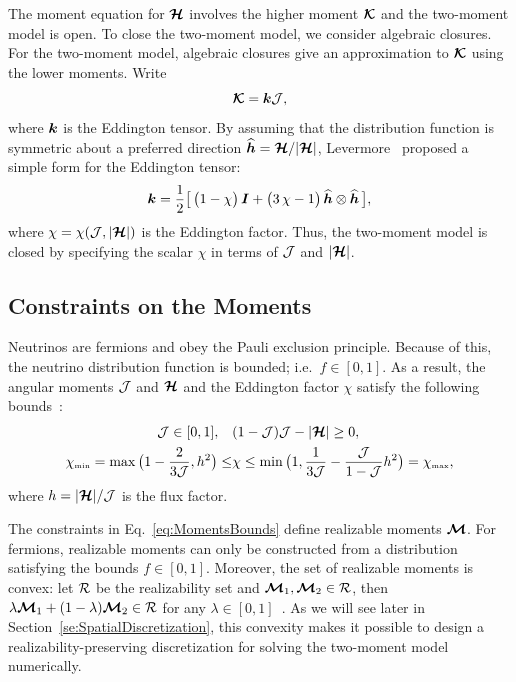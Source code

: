 The moment equation for $\boldsymbol{\mathcal{H}}$ involves the higher moment $\boldsymbol{\mathcal{K}}$ and the two-moment model is open.  
To close the two-moment model, we consider algebraic closures.  
For the two-moment model, algebraic closures give an approximation to $\boldsymbol{\mathcal{K}}$ using the lower moments.  
Write
\begin{equation}
  \boldsymbol{\mathcal{K}} = \boldsymbol{k} \mathcal{J},
\end{equation}
where $\boldsymbol{k}$ is the Eddington tensor.  
By assuming that the distribution function is symmetric about a preferred direction $\widehat{\boldsymbol{h}}=\boldsymbol{\mathcal{H}}/|\boldsymbol{\mathcal{H}}|$, Levermore~\cite{levermore_1984} proposed a simple form for the Eddington tensor:
\begin{equation}
  \boldsymbol{k}=\frac{1}{2}\big[\,\big(1-\chi\big)\,\boldsymbol{I}+\big(3\,\chi-1\big)\,\widehat{\boldsymbol{h}}\otimes\widehat{\boldsymbol{h}}\,\big],
  \label{eq:eddingtonTensor}
\end{equation}
where $\chi=\chi(\mathcal{J},|\boldsymbol{\mathcal{H}}|)$ is the Eddington factor.  
Thus, the two-moment model is closed by specifying the scalar $\chi$ in terms of $\mathcal{J}$ and $|\boldsymbol{\mathcal{H}}|$.  

\subsection{Constraints on the Moments}

Neutrinos are fermions and obey the Pauli exclusion principle.  
Because of this, the neutrino distribution function is bounded; i.e.~$f \in [0,1]$.
As a result, the angular moments $\mathcal{J}$ and $\boldsymbol{\mathcal{H}}$ and the Eddington factor $\chi$ satisfy the following bounds~\cite{levermore_1984,lareckiBanach_2011,kershaw_1976,shohatTamarkin_1943}: 
\begin{align}
\mathcal{J} \in[0,1], \quad &(1-\mathcal{J})\mathcal{J}-|\boldsymbol{\mathcal{H}}| \geq 0, \label{eq:MomentsBounds} \\
  \chi_{\mbox{\tiny min}}
  =\max\big(1-\frac{2}{3\mathcal{J}},h^{2}\big)
  \leq & \chi \leq \min\big(1,\frac{1}{3\mathcal{J}}-\frac{\mathcal{J}}{1-\mathcal{J}}h^{2}\big)=\chi_{\mbox{\tiny max}},
  \label{eq:eddingtonFactorBounds}
\end{align}
where $h = |\boldsymbol{\mathcal{H}}|/\mathcal{J}$ is the flux factor.  

The constraints in Eq.~\eqref{eq:MomentsBounds} define realizable moments $\boldsymbol{\mathcal{M}}$.  
For fermions, realizable moments can only be constructed from a distribution satisfying the bounds $f \in [0,1]$.  
Moreover, the set of realizable moments is convex: let $\mathcal{R}$ be the realizability set and $\boldsymbol{\mathcal{M}}_{1}, \boldsymbol{\mathcal{M}}_{2} \in \mathcal{R}$, then $\lambda \boldsymbol{\mathcal{M}}_{1} + (1-\lambda)\boldsymbol{\mathcal{M}}_{2} \in \mathcal{R}$ for any $\lambda \in [0,1]$~\cite{chu_etal_2018}.
As we will see later in Section~\ref{se:SpatialDiscretization}, this convexity makes it possible to design a realizability-preserving discretization for solving the two-moment model numerically.

